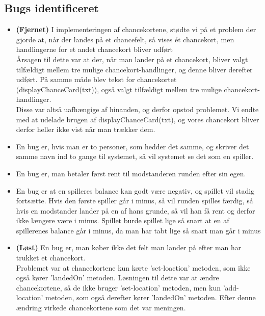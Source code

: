 \documentclass{article}
\begin{document}
\subsection{Bugs identificeret}
\begin{itemize}
\item \textbf{(Fjernet)} I implementeringen af chancekortene, stødte vi på et problem der gjorde at, når der landes på et chancefelt, så vises ét chancekort, men handlingerne for et andet chancekort bliver udført\\
Årsagen til dette var at der, når man lander på et 					chancekort, bliver valgt tilfældigt mellem tre mulige chancekort-handlinger, og denne bliver derefter udført. På samme måde blev tekst for chancekortet (displayChanceCard(txt)), også valgt tilfældigt mellem tre mulige chancekort-handlinger. \\
Disse var altså uafhængige af hinanden, og derfor opstod problemet.
Vi endte med at udelade brugen af displayChanceCard(txt), og vores chancekort bliver derfor heller ikke vist når man trækker dem.

\item En bug er, hvis man er to personer, som hedder det samme, og skriver det samme navn ind to gange til systemet, så vil systemet se det som en spiller.

\item  En bug er, man betaler først rent til modstanderen runden efter sin egen. 

\item En bug er at en spilleres balance kan godt være negativ, og spillet vil stadig fortsætte. Hvis den første spiller går i minus, så vil runden spilles færdig, så hvis en modstander lander på en af hans grunde, så vil han få rent og derfor ikke længere være i minus. Spillet burde spillet lige så snart at en af spillerenes balance går i minus, da man har tabt lige så snart man går  i minus

\item \textbf{(Løst)} En bug er, man køber ikke det felt man lander på efter man har trukket et chancekort. 
\\
Problemet var at chancekortene kun kørte ’set-loaction’ metoden, som ikke også kører 'landedOn' metoden. Løsningen til dette var at ændre chancekortene, så de ikke bruger 'set-location' metoden, men kun 'add-location' metoden, som også derefter kører 'landedOn' metoden. Efter denne ændring virkede chancekortene som det var meningen.
\end{itemize}
\end{document}
